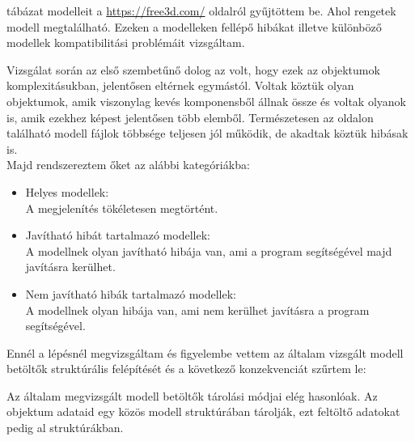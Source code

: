  tábázat modelleit a \url{https://free3d.com/} oldalról gyűjtöttem be. Ahol rengetek modell megtalálható. Ezeken a modelleken fellépő hibákat illetve különböző modellek kompatibilitási problémáit vizsgáltam.

Vizsgálat során az  első szembetűnő dolog az volt, hogy ezek az objektumok komplexitásukban, jelentősen eltérnek egymástól. Voltak köztük olyan objektumok, amik viszonylag kevés komponensből állnak össze és voltak olyanok is, amik ezekhez képest jelentősen több elemből.
Természetesen az oldalon található modell fájlok többsége teljesen jól működik, de akadtak köztük hibásak is.\\

Majd rendszereztem őket az alábbi kategóriákba:
\begin{itemize}
\item Helyes modellek:\\
A megjelenítés tökéletesen megtörtént.
\bigskip
\item Javítható hibát tartalmazó modellek:\\
A modellnek olyan javítható hibája van, ami a program segítségével majd javításra kerülhet.
\bigskip
\item Nem javítható hibák tartalmazó modellek:\\
A modellnek olyan hibája van, ami nem kerülhet javításra a program segítségével.
\end{itemize}
\bigskip

\newpage


\noindent Ennél a lépésnél megvizsgáltam és figyelembe vettem az általam vizsgált modell betöltők struktúrális felépítését és a következő konzekvenciát szűrtem le:

Az általam megvizsgált modell betöltők tárolási módjai elég hasonlóak. Az objektum adataid egy közös modell struktúrában tárolják, ezt feltöltő adatokat pedig al struktúrákban.\\

